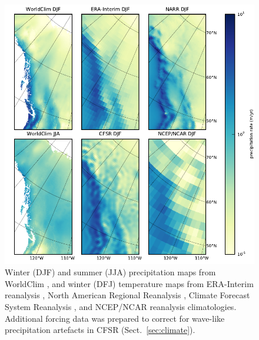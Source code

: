 \documentclass[tc, ms]{copernicus}
\begin{document}
\begin{figure}[t]
	\vspace*{2mm}
	\begin{center}
		\includegraphics{cordillera-climate-prec}
	\end{center}
	\caption{Winter (DJF) and summer (JJA) precipitation maps from WorldClim \citep{data:worldclim}, and winter (DFJ) temperature maps from ERA-Interim reanalysis \citep{data:erai}, North American Regional Reanalysis \citep[NARR;][]{data:narr}, Climate Forecast System Reanalysis \citep[CFSR;][]{data:cfsr}, and NCEP/NCAR reanalysis \citep{data:ncar} climatologies. Additional forcing data was prepared to correct for wave-like precipitation artefacts in CFSR (Sect.~\ref{sec:climate}).}
	\label{fig:prec}
\end{figure}
\end{document}
